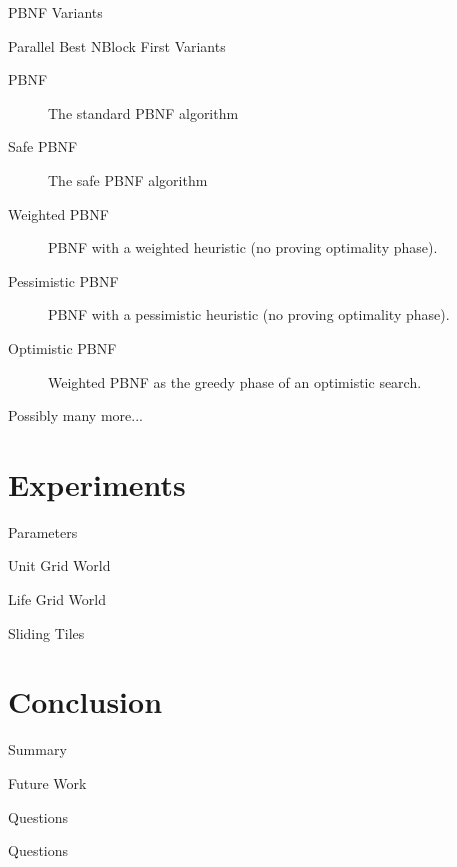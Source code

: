 \documentclass[style=unh]{powerdot}
\begin{document}

\begin{slide}{PBNF Variants}
  \vspace{.2in}
  \begin{center}
    Parallel Best NBlock First Variants
  \end{center}
  \begin{description}
  \item[PBNF] The standard PBNF algorithm
  \item[Safe PBNF] The safe PBNF algorithm
  \item[Weighted PBNF] PBNF with a weighted heuristic (no proving
    optimality phase).
  \item[Pessimistic PBNF] PBNF with a pessimistic heuristic (no proving
    optimality phase).
  \item[Optimistic PBNF] Weighted PBNF as the greedy phase of an optimistic search.
  \item[Possibly many more...]
  \end{description}
\end{slide}


\section{Experiments}


\begin{slide}{Parameters}
\end{slide}


\begin{slide}{Unit Grid World}
\end{slide}


\begin{slide}{Life Grid World}
\end{slide}


\begin{slide}{Sliding Tiles}
\end{slide}


\section{Conclusion}


\begin{slide}{Summary}
\end{slide}


\begin{slide}{Future Work}
\end{slide}


\begin{slide}{Questions}
\end{slide}{Questions}

\end{document}
